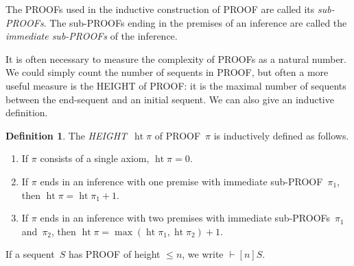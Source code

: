 \documentclass[10pt,a4paper]{article}
\newcommand*{\olup}[1]{\MakeUppercase{#1}}
\theoremstyle{plain}
\theoremstyle{definition}
\newtheorem{defn}[thm]{Definition}
\theoremstyle{remark}
\providecommand{\Proves}{\mathrel{\vdash}}
\providecommand{\pheight}{\operatorname{ht}}
\begin{document}
The \olup{proof}s used in the inductive construction of
\olup{proof} are called its \emph{sub-\olup{proof}s}. The
sub-\olup{proof}s ending in the premises of an inference are called
the \emph{immediate sub-\olup{proof}s} of the inference.

It is often necessary to measure the complexity of \olup{proof}s as
a natural number. We could simply count the number of sequents in
\olup{proof}, but often a more useful measure is the \olup{height} of
\olup{proof}: it is the maximal number of sequents between the
end-sequent and an initial sequent. We can also give an inductive
definition.

\begin{defn}
The \emph{\olup{height}}~$\pheight{\pi}$ of \olup{proof}~$\pi$ is
inductively defined as follows.
\begin{enumerate}
  \item If $\pi$ consists of a single axiom, $\pheight{\pi} = 0$.
  \item If $\pi$ ends in an inference with one premise with immediate
  sub-\olup{proof}~$\pi_1$, then $\pheight{\pi} = \pheight{\pi_1} + 1$.
  \item If $\pi$ ends in an inference with two premises with immediate
  sub-\olup{proof}s~$\pi_1$ and~$\pi_2$, then $\pheight{\pi} =
  \max(\pheight{\pi_1}, \pheight{\pi_2}) + 1$.
\end{enumerate}
If a sequent~$S$ has \olup{proof} of height $\le n$, we write $\Proves[n] S$.
\end{defn}
\end{document}
